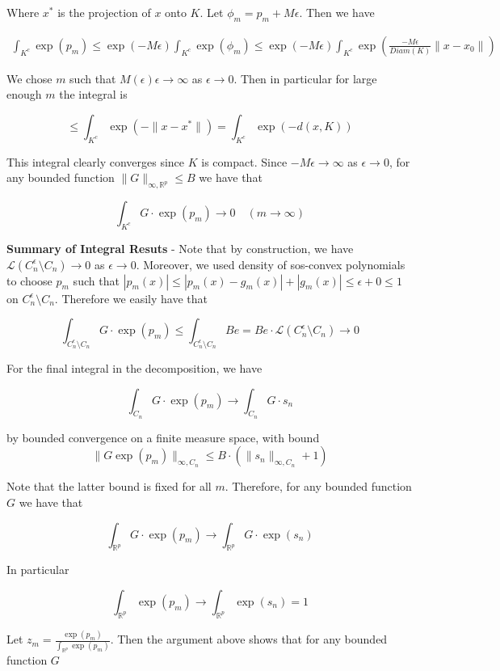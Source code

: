 \documentclass[11pt,reqno]{amsart}
\theoremstyle{definition}
\numberwithin{equation}{section}
\newcommand{\lft}{\left(}
\newcommand{\rt}{\right)}
\newcommand{\eps}{\epsilon}
\newcommand{\mc}{\mathcal}
\newcommand{\mr}{\mathbb{R}}
\newcommand{\tb}{\textbf}
\begin{document}
Where $x^*$ is the projection of $x$ onto $K$. Let $\phi_m = p_m + M \eps $. Then we have 

\begin{align*}
\int_{K^c} \exp(p_m) \leq \exp(-M \eps) \int_{K^c} \exp(\phi_m) \leq \exp(-M \eps) \int_{K^c} \exp \lft \frac{-M \eps}{Diam(K)}\|x - x_0\| \rt 
\end{align*}

We chose $m$ such that $M(\eps) \eps \to \infty$ as $\eps \to 0$. Then in particular for large enough $m$ the integral is 

\[
\leq \int_{K^c} \exp \lft -\|x - x^*\| \rt  = \int_{K^c} \exp \lft -d(x,K) \rt 
\]

This integral clearly converges since $K$ is compact. Since $-M \eps \to \infty$ as $\eps \to 0$, for any bounded function $\|G\|_{\infty, \mr^p} \leq B$ we have that 

\[
\int_{K^c} G \cdot \exp (p_m)  \to 0 \quad (m \to \infty) 
\]

\tb{Summary of Integral Resuts} - Note that by construction, we have $\mc{L}(C_n^{\eps} \setminus C_n) \to 0$ as $\eps \to 0$. Moreover, we used density of sos-convex polynomials to choose $p_m$ such that $|p_m(x)| \leq |p_m(x) - g_m(x)| + |g_m(x)| \leq \epsilon + 0 \leq 1$ on $C_n^{\eps} \setminus C_n$. Therefore we easily have that 

\[
\int_{C_n^{\eps} \setminus C_n} G \cdot \exp(p_m) \leq \int_{C_n^{\eps} \setminus C_n} Be = Be \cdot \mc{L}(C_n^{\eps} \setminus C_n) \to 0
\]

For the final integral in the decomposition, we have 

\[
\int_{C_n} G \cdot \exp(p_m) \to \int_{C_n} G \cdot s_n
\]

by bounded convergence on a finite measure space, with bound \\

\[
\|G \exp(p_m) \|_{\infty, C_n} \leq B \cdot (\|s_n\|_{\infty, C_n} + 1) 
\]

 Note that the latter bound is fixed for all $m$. Therefore, for any bounded function $G$ we have that 

\[
\int_{\mr^p} G\cdot \exp(p_m) \to \int_{\mr^p} G \cdot \exp(s_n) 
\]

In particular 

\[
\int_{\mr^p} \exp(p_m) \to \int_{\mr^p} \exp(s_n ) = 1
\]

Let $z_m = \frac{\exp(p_m)}{\int_{\mr^p} \exp(p_m)} $. Then the argument above shows that for any bounded function $G$
\end{document}
